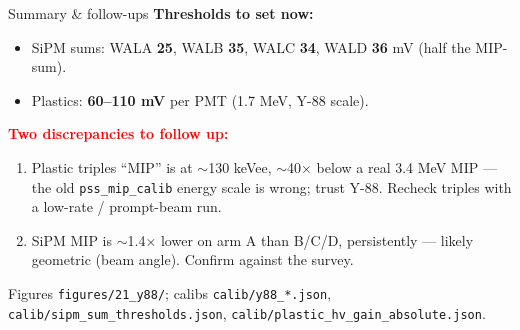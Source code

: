 \documentclass[aspectratio=169,10pt]{beamer}
\begin{document}
\begin{frame}{Summary \& follow-ups}
\textbf{Thresholds to set now:}
\begin{itemize}
\item SiPM sums: WALA \textbf{25}, WALB \textbf{35}, WALC \textbf{34},
      WALD \textbf{36} mV (half the MIP-sum).
\item Plastics: \textbf{60--110 mV} per PMT (1.7 MeV, Y-88 scale).
\end{itemize}
\vspace{1ex}
\textbf{\textcolor{red}{Two discrepancies to follow up:}}
\begin{enumerate}
\item Plastic triples ``MIP'' is at $\sim$130 keVee, $\sim$40$\times$ below a
      real 3.4 MeV MIP --- the old \texttt{pss\_mip\_calib} energy scale is
      wrong; trust Y-88. Recheck triples with a low-rate / prompt-beam run.
\item SiPM MIP is $\sim$1.4$\times$ lower on arm A than B/C/D, persistently ---
      likely geometric (beam angle). Confirm against the survey.
\end{enumerate}
\vfill
{\small Figures \texttt{figures/21\_y88/}; calibs \texttt{calib/y88\_*.json},
\texttt{calib/sipm\_sum\_thresholds.json},
\texttt{calib/plastic\_hv\_gain\_absolute.json}.}
\end{frame}
\end{document}
